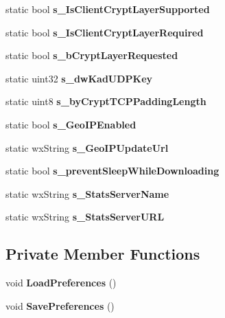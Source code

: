 \begin{DoxyCompactItemize}
\item 
static bool {\bfseries s\_\-IsClientCryptLayerSupported}\label{classCPreferences_a1fd963ca4fc26ca61f6e99c1153bdfb0}

\item 
static bool {\bfseries s\_\-IsClientCryptLayerRequired}\label{classCPreferences_a6b020dc7c3827f7d77ab32c33e224773}

\item 
static bool {\bfseries s\_\-bCryptLayerRequested}\label{classCPreferences_abb59830b919b1dd48e5d1ae7500cd559}

\item 
static uint32 {\bfseries s\_\-dwKadUDPKey}\label{classCPreferences_a707bcd2616a634ae4ff6f451bd5c4956}

\item 
static uint8 {\bfseries s\_\-byCryptTCPPaddingLength}\label{classCPreferences_a34698c67c4662948a916fb170d9a1cbe}

\item 
static bool {\bfseries s\_\-GeoIPEnabled}\label{classCPreferences_ad30e148d9f201d6a50b1064b6e5e71e1}

\item 
static wxString {\bfseries s\_\-GeoIPUpdateUrl}\label{classCPreferences_a12d8ec10792008f526003a4de1f7beae}

\item 
static bool {\bfseries s\_\-preventSleepWhileDownloading}\label{classCPreferences_a82ddbb25671f3cc9769597a5787a63ff}

\item 
static wxString {\bfseries s\_\-StatsServerName}\label{classCPreferences_ac81786b27d80c5c5116e2dc63063b931}

\item 
static wxString {\bfseries s\_\-StatsServerURL}\label{classCPreferences_a516c01371301dc0a76c77184c1be801c}

\end{DoxyCompactItemize}
\subsection*{Private Member Functions}
\begin{DoxyCompactItemize}
\item 
void {\bfseries LoadPreferences} ()\label{classCPreferences_a556e2cbbc92551f575fdaadde63fcd4b}

\item 
void {\bfseries SavePreferences} ()\label{classCPreferences_a1dd263e3f0a89b3f4fc9c2ad25df1d0d}

\end{DoxyCompactItemize}
